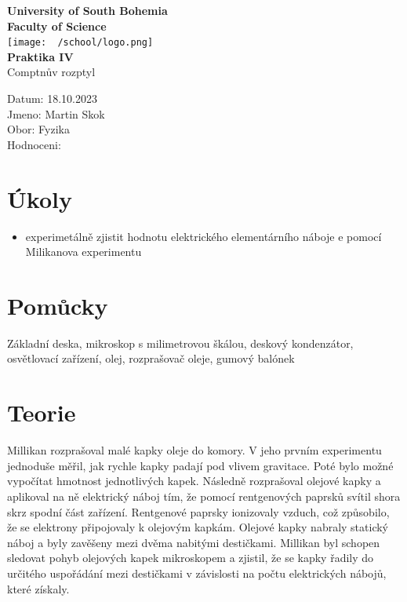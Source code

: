 \documentclass{article}
\begin{document}
\begin{center}
\textbf{\Huge{University of South Bohemia}}\\
\vspace{50px}
\textbf{\Large{Faculty of Science}} \\
\vspace{30px}
\texttt{[image: ~/school/logo.png]} \\
\vspace{30px}
\textbf{\large{Praktika IV}}
\vspace{20px}
\\
\vspace{20px}
\large{Comptnův rozptyl} \\
\vspace{60px}
\end{center}
\begin{flushleft}
Datum: 18.10.2023 \\
Jmeno: Martin Skok \\
Obor: Fyzika \\
Hodnoceni:
\end{flushleft}
\newpage
\section{Úkoly}
\begin{itemize}
  \item{experimetálně zjistit hodnotu elektrického elementárního náboje e pomocí Milikanova experimentu}
\end{itemize}
\section{Pomůcky}
Základní deska, mikroskop s milimetrovou škálou, deskový kondenzátor, osvětlovací zařízení,
olej, rozprašovač oleje, gumový balónek
\section{Teorie}
Millikan rozprašoval malé kapky oleje do komory. V jeho prvním experimentu jednoduše měřil, jak rychle kapky padají pod vlivem gravitace. Poté bylo možné vypočítat hmotnost jednotlivých kapek. Následně rozprašoval olejové kapky a aplikoval na ně elektrický náboj tím, že pomocí rentgenových paprsků svítil shora skrz spodní část zařízení. Rentgenové paprsky ionizovaly vzduch, což způsobilo, že se elektrony připojovaly k olejovým kapkám. Olejové kapky nabraly statický náboj a byly zavěšeny mezi dvěma nabitými destičkami. Millikan byl schopen sledovat pohyb olejových kapek mikroskopem a zjistil, že se kapky řadily do určitého uspořádání mezi destičkami v závislosti na počtu elektrických nábojů, které získaly.\\
\end{document}
